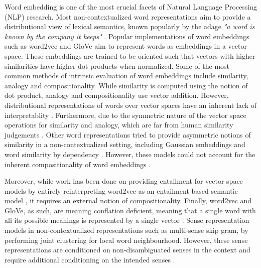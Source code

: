 \documentclass[11pt]{book}
\newcommand{\citep}[1]{\cite{#1}}
\begin{document}
Word embedding is one of the most crucial facets of Natural Language Processing
(NLP) research. Most non-contextualized word representations aim to provide a
distributional view of lexical semantics, known popularly by the adage
\textit{"a word is known by the company it keeps"} \citep{firth1957synopsis}.
Popular implementations of word embeddings such as word2vec
\citep{mikolov2013efficient} and GloVe \citep{pennington2014glove} aim to
represent words as embeddings in a vector space. These embeddings are trained
to be oriented such that vectors with higher similarities have higher dot
products when normalized. Some of the most common methods of intrinsic
evaluation of word embeddings include similarity, analogy and compositionality.
While similarity is computed using the notion of dot product, analogy and
compositionality use vector addition.
However, distributional representations of words over vector spaces have an
inherent lack of interpretablity \citep{goldberg2014word2vec}. Furthermore, due
to the symmetric nature of the vector space operations for similarity and
analogy, which are far from human similarity judgements
\citep{tversky1977features}. Other word representations tried to provide
asymmetric notions of similarity in a non-contextualized setting, including
Gaussian embeddings \citep{vilnis2014word} and word similarity by dependency
\citep{gawron2014improving}. However, these models could not account for the
inherent compositionality of word embeddings \citep{mikolov2013distributed}.

Moreover, while work has been done on providing entailment for vector space
models by entirely reinterpreting word2vec as an entailment based semantic
model \citep{henderson2016vector}, it requires an external notion of
compositionality. Finally, word2vec and GloVe, as such, are meaning conflation
deficient, meaning that a single word with all its possible meanings is
represented by a single vector \citep{camacho2018word}. Sense representation
models in non-contextualized representations such as multi-sense skip gram, by
performing joint clustering for local word neighbourhood. However, these sense
representations are conditioned on non-disambiguated senses in the context and
require additional conditioning on the intended senses \citep{li2015multi}.
\end{document}
